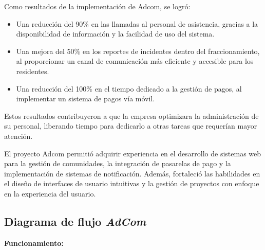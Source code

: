 \documentclass[protocolo.tex]{subfiles}
\begin{document}
Como resultados de la implementación de Adcom, se logró:

\begin{itemize}
\item Una reducción del 90\% en las llamadas al personal de asistencia,  gracias a la disponibilidad de información y la  facilidad  de  uso  del  sistema.
\item Una mejora del 50\% en los reportes de incidentes dentro del fraccionamiento,  al  proporcionar  un  canal  de  comunicación  más  eficiente  y  accesible  para  los  residentes.
\item Una reducción del 100\% en el tiempo dedicado a la gestión de pagos,  al  implementar  un  sistema  de  pagos  vía  móvil.
\end{itemize}

Estos resultados contribuyeron a que la empresa  optimizara la administración de su personal, liberando tiempo para dedicarlo a otras tareas que requerían  mayor  atención.\vspace{4mm}

El proyecto Adcom permitió adquirir experiencia en el desarrollo de sistemas web para la gestión de comunidades,  la integración de pasarelas de pago y la  implementación  de  sistemas  de  notificación.  Además,  fortaleció  las  habilidades  en  el  diseño  de  interfaces  de  usuario  intuitivas  y  la  gestión  de  proyectos  con  enfoque  en  la  experiencia  del  usuario.

\subsection{Diagrama de flujo \textit{AdCom}} 

\textbf{Funcionamiento:}
\end{document}
